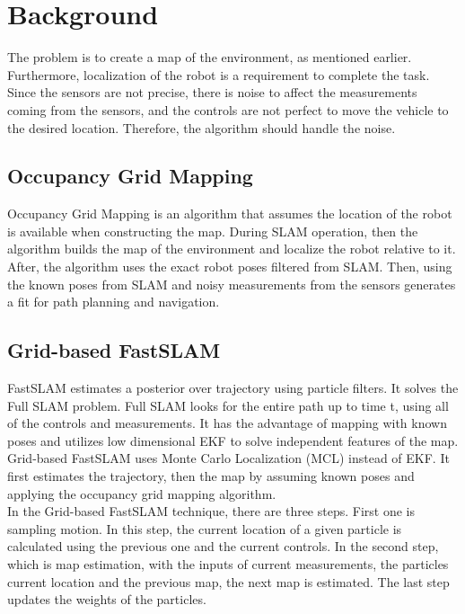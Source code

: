 \documentclass[10pt,journal,compsoc]{IEEEtran}
\begin{document}
\section{Background}
The problem is to create a map of the environment, as mentioned earlier. Furthermore, localization of the robot is a requirement to complete the task. Since the sensors are not precise, there is noise to affect the measurements coming from the sensors, and the controls are not perfect to move the vehicle to the desired location. Therefore, the algorithm should handle the noise.

\subsection{Occupancy Grid Mapping}
Occupancy Grid Mapping is an algorithm that assumes the location of the robot is available when constructing the map\cite{wiki:ogm}. During SLAM operation, then the algorithm builds the map of the environment and localize the robot relative to it. After, the algorithm uses the exact robot poses filtered from SLAM. Then, using the known poses from SLAM and noisy measurements from the sensors generates a fit for path planning and navigation.

\subsection{Grid-based FastSLAM}
FastSLAM estimates a posterior over trajectory using particle filters. It solves the Full SLAM problem. Full SLAM looks for the entire path up to time t, using all of the controls and measurements. It has the advantage of mapping with known poses and utilizes low dimensional EKF to solve independent features of the map.
\\
Grid-based FastSLAM uses Monte Carlo Localization (MCL) instead of EKF. It first estimates the trajectory, then the map by assuming known poses and applying the occupancy grid mapping algorithm.
\\
In the Grid-based FastSLAM technique, there are three steps. First one is sampling motion. In this step, the current location of a given particle is calculated using the previous one and the current controls. In the second step, which is map estimation, with the inputs of current measurements, the particles current location and the previous map, the next map is estimated. The last step updates the weights of the particles.
\end{document}
